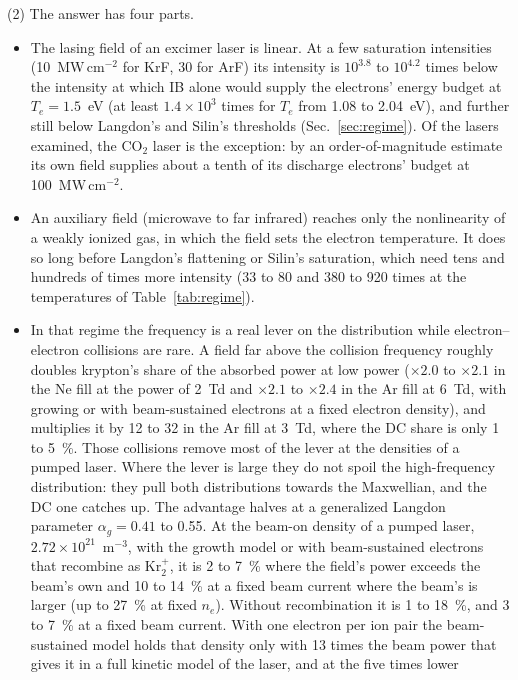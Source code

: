 \documentclass[11pt]{article}
\numberwithin{equation}{section}
\begin{document}
{\noindent}(2) The answer has four parts.
\begin{itemize}
\item The lasing field of an excimer laser is linear. At a few saturation
  intensities (10~MW\,cm$^{-2}$ for KrF, 30 for ArF) its intensity is $10^{3.8}$ to
  $10^{4.2}$ times below the intensity at which IB alone would supply the electrons'
  energy budget at $T_e=1.5$~eV (at least $1.4\times10^3$ times for $T_e$ from 1.08
  to 2.04~eV), and further still below Langdon's and Silin's thresholds
  (Sec.~\ref{sec:regime}). Of the lasers examined, the CO$_2$ laser is the
  exception: by an order-of-magnitude estimate its own field supplies about a tenth of
  its discharge electrons' budget at 100~MW\,cm$^{-2}$.
\item An auxiliary field (microwave to far infrared) reaches only the
  nonlinearity of a weakly ionized gas, in which the field sets the electron
  temperature. It does so long before Langdon's flattening or Silin's saturation,
  which need tens and hundreds of times more intensity (33 to 80 and 380 to 920 times
  at the temperatures of Table~\ref{tab:regime}).
\item In that regime the frequency is a real lever on the distribution while
  electron--electron collisions are rare. A field far above the collision frequency
  roughly doubles krypton's share of the absorbed power at low power ($\times2.0$ to
  $\times2.1$ in the Ne fill at the power of 2~Td and $\times2.1$ to $\times2.4$ in the
  Ar fill at 6~Td, with growing or with beam-sustained electrons at a fixed electron
  density), and multiplies it
  by 12 to 32 in the Ar fill at 3~Td, where the DC share is only 1 to 5~\%. Those
  collisions remove most of the lever at the densities of a pumped laser. Where the
  lever is large they do not spoil the high-frequency distribution: they pull both
  distributions towards the Maxwellian, and the DC one catches up. The advantage
  halves at a generalized Langdon parameter $\alpha_g=0.41$ to 0.55. At the
  beam-on density of a pumped laser, $2.72\times10^{21}$~m$^{-3}$, with the growth model or with
  beam-sustained electrons that recombine as Kr$_2^+$, it is 2 to 7~\% where the field's
  power exceeds the beam's own and 10 to 14~\% at a fixed beam current where the beam's is
  larger (up to 27~\% at fixed $n_e$). Without recombination it is 1 to 18~\%, and 3 to
  7~\% at a fixed beam current. With one electron per ion pair the beam-sustained model
  holds that density only with 13 times the beam power that gives it in a full kinetic
  model of the laser, and at the five times lower

\end{itemize}
\end{document}
